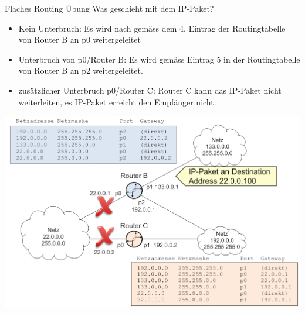 \begin{example2}{Flaches Routing Übung}
Was geschieht mit dem IP-Paket?
    \begin{itemize}
        \item Kein Unterbruch: Es wird nach gemäss dem 4. Eintrag der Routingtabelle von Router B an p0 weitergeleitet
        \item Unterbruch von p0/Router B: Es wird gemäss Eintrag 5 in der Routingtabelle von Router B an p2 weitergeleitet.
        \item zusätzlicher Unterbruch p0/Router C: Router C kann das IP-Paket nicht weiterleiten, es IP-Paket erreicht den Empfänger nicht.
    \end{itemize}
        \includegraphics[width=1\linewidth]{images/flaches_routing_bsp.png}
\end{example2}

